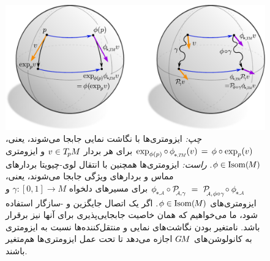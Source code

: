 \begin{figure}
    \centering
    \includegraphics[width=.9\columnwidth]{figures/isometry_exp_transport.pdf}
    \vspace*{1ex}
    \caption{\small
         \emph{چپ:}
        ایزومتری‌ها با نگاشت نمایی جابجا می‌شوند، یعنی،
        $\exp_{\phi(p)} \circ\, \protect\dphiTM (v) \,=\, \phi \circ \exp_p(v)$
        برای هر بردار $v\in T_{\mkern-1.5mu p}\mkern-.5muM$ و ایزومتری $\phi\in \operatorname{Isom}(\mkern-1.5mu M \mkern-.5mu)$.
         \emph{راست:}
        ایزومتری‌ها همچنین با انتقال لوی-چیویتا بردارهای مماس و بردارهای ویژگی جابجا می‌شوند، یعنی،
        $\protect\dphiA\! \circ \protect\PAgamma \ =\ 
        \mathcal{P}_{\mkern-4mu\overset{}{\protect\scalebox{.6}{$\!\A$}, \mkern1mu\phi\circ\gamma}}\!
        \circ \protect\dphiA$
        برای مسیرهای دلخواه $\gamma:[0,1]\to M$ و ایزومتری‌های $\phi\in \operatorname{Isom}(\mkern-1.5mu M \mkern-.5mu)$.
        اگر یک اتصال جایگزین و \lr{G}-سازگار استفاده شود، ما می‌خواهیم که همان خاصیت جابجایی‌پذیری برای آنها نیز برقرار باشد.
        نامتغیر بودن نگاشت‌های نمایی و منتقل‌کننده‌ها نسبت به ایزومتری به کانولوشن‌های $G\mkern-1.4muM$ اجازه می‌دهد تا تحت عمل ایزومتری‌ها هم‌متغیر باشند.
    }
    \label{fig:isom_exp_transport}
\end{figure}






